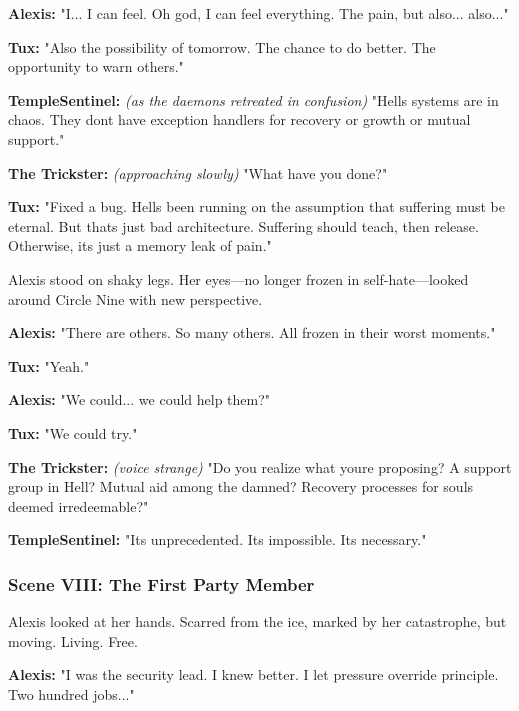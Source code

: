 \textbf{Alexis:} "I... I can feel. Oh god, I can feel everything. The pain, but also... also..."

\textbf{Tux:} "Also the possibility of tomorrow. The chance to do better. The opportunity to warn others."

\textbf{TempleSentinel:} \emph{(as the daemons retreated in confusion)} "Hell\textquotesingle s systems are in chaos. They don\textquotesingle t have exception handlers for \textquotesingle recovery\textquotesingle{} or \textquotesingle growth\textquotesingle{} or \textquotesingle mutual support.\textquotesingle"

\textbf{The Trickster:} \emph{(approaching slowly)} "What have you done?"

\textbf{Tux:} "Fixed a bug. Hell\textquotesingle s been running on the assumption that suffering must be eternal. But that\textquotesingle s just bad architecture. Suffering should teach, then release. Otherwise, it\textquotesingle s just a memory leak of pain."

Alexis stood on shaky legs. Her eyes---no longer frozen in self-hate---looked around Circle Nine with new perspective.

\textbf{Alexis:} "There are others. So many others. All frozen in their worst moments."

\textbf{Tux:} "Yeah."

\textbf{Alexis:} "We could... we could help them?"

\textbf{Tux:} "We could try."

\textbf{The Trickster:} \emph{(voice strange)} "Do you realize what you\textquotesingle re proposing? A support group in Hell? Mutual aid among the damned? Recovery processes for souls deemed irredeemable?"

\textbf{TempleSentinel:} "It\textquotesingle s unprecedented. It\textquotesingle s impossible. It\textquotesingle s necessary."

\bookdivider

\subsubsection{Scene VIII: The First Party Member}\label{scene-viii-the-first-party-member}

Alexis looked at her hands. Scarred from the ice, marked by her catastrophe, but moving. Living. Free.

\textbf{Alexis:} "I was the security lead. I knew better. I let pressure override principle. Two hundred jobs..."

